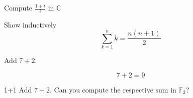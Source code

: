 \begin{question}{1}
	Compute \(\frac{1+i}{i}\) in \(\mathbb{C}\)
\end{question}

\begin{question}[name=Exmatrikulator]{1}
	Show inductively \[\sum_{k=1}^n k = \frac{n(n+1)}{2}\]
\end{question}

\begin{question}{7.5}
	Add \(7+2\).
\end{question} 
\begin{solution} 
	\[7+2=9\]
\end{solution}

\begin{question}{1+1}
	Add \(7+2\). Can you compute the respective sum in \(\mathbb{F}_2\)?
\end{question} 